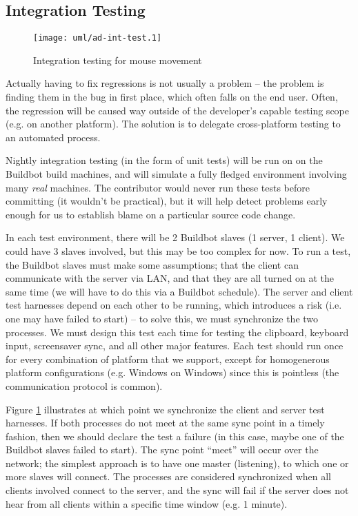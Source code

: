 \subsection{Integration Testing}

\begin{figure}[ht!]
  \centering
  \texttt{[image: uml/ad-int-test.1]}
  \caption{Integration testing for mouse movement}
  \label{fig:integrationTesting}
\end{figure}

Actually having to fix regressions is not usually a problem -- the problem is
finding them in the bug in first place, which often falls on the end user. 
Often, the regression will be caused way outside of the developer's capable 
testing scope (e.g. on another platform). The solution is to delegate 
cross-platform testing to an automated process.

Nightly integration testing (in the form of unit tests) will be run on on the 
Buildbot build machines, and will simulate a fully fledged environment involving
many \textit{real} machines. The contributor would never run these tests before
committing (it wouldn't be  practical), but it will help detect problems early
enough for us to establish blame on a particular source code change.

In each test environment, there will be 2 Buildbot slaves (1 server, 1 client).
We could have 3 slaves involved, but this may be too complex for now.
To run a test, the Buildbot slaves must make some assumptions; that the client
can communicate with the server via LAN, and that they are all turned on at the 
same time (we will have to do this via a Buildbot schedule). The server and 
client test harnesses depend on each other to be running, which introduces a
risk (i.e. one may have failed to start) -- to solve this, we must synchronize
the two processes. We must design this test each time for testing the clipboard,
keyboard input, screensaver sync, and all other major features. Each test should
run once for every combination of platform that we support, except for 
homogenerous platform configurations (e.g. Windows on Windows) since this is
pointless (the communication protocol is common).

Figure \ref{fig:integrationTesting} illustrates at which point we synchronize
the client and server test harnesses. If both processes do not meet at the same
sync point in a timely fashion, then we should declare the test a failure (in
this case, maybe one of the Buildbot slaves failed to start). The sync point
``meet'' will occur over the network; the simplest approach is to have one 
master (listening), to which one or more slaves will connect. The processes are
considered synchronized when all clients involved connect to the server, and
the sync will fail if the server does not hear from all clients within a 
specific time window (e.g. 1 minute).

